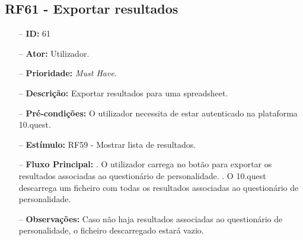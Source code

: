 \subsection{RF61 - Exportar resultados}
\begin{itemize}
	\item[--] \textbf{ID:} 61
	\item[--]  \textbf{Ator:} Utilizador.
	\item[--]  \textbf{Prioridade:} \textit{Must Have}.
	\item[--]  \textbf{Descrição:} Exportar resultados para uma spreadsheet.
	\item[--]  \textbf{Pré-condições:} O utilizador necessita de estar autenticado na plataforma 10.quest.
	\item[--]  \textbf{Estímulo:}  
	\subitem RF59 - Mostrar lista de resultados.
	\item[--]  \textbf{Fluxo Principal:} 
	. O utilizador carrega no botão para exportar os resultados associadas ao questionário de personalidade.
	. O 10.quest descarrega um ficheiro com todas os resultados associadas ao questionário de personalidade.
	\item[--]  \textbf{Observações:} Caso não haja resultados associadas ao questionário de personalidade, o ficheiro descarregado estará vazio.
\end{itemize}
\newpage


